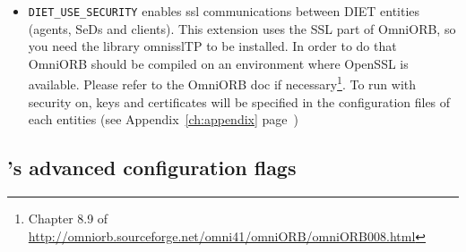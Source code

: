 \begin{itemize}
\item
  \label{sec:securityinstall}
  \verb+DIET_USE_SECURITY+ enables ssl communications between DIET entities
  (agents, SeDs and clients). This extension uses the SSL part of OmniORB,
  so you need the library omnisslTP to be installed. In order to do that
  OmniORB should be compiled on an environment where OpenSSL is available.
  Please refer to the OmniORB doc if necessary\footnote{Chapter 8.9 of
  \url{http://omniorb.sourceforge.net/omni41/omniORB/omniORB008.html}}.
  To run \diet with security on, keys and certificates will be specified in the
  configuration files of each entities (see Appendix~\ref{ch:appendix} page~\pageref{appendix_ssl})

\end{itemize}

\subsection{\diet's advanced configuration flags}
\noindent

